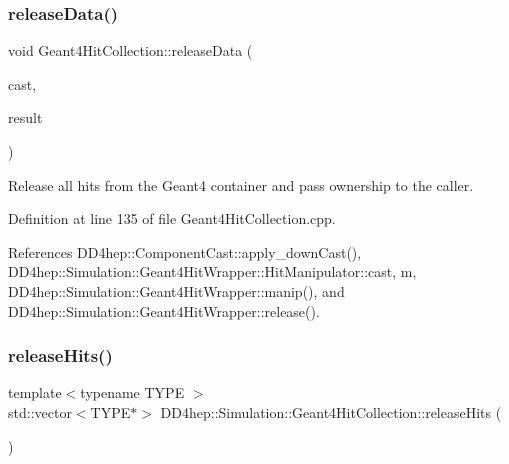 \subsubsection{\texorpdfstring{release\+Data()}{releaseData()}}
{\footnotesize\ttfamily void Geant4\+Hit\+Collection\+::release\+Data (\begin{DoxyParamCaption}\item[{const \hyperlink{class_d_d4hep_1_1_component_cast}{Component\+Cast} \&}]{cast,  }\item[{std\+::vector$<$ void $\ast$$>$ $\ast$}]{result }\end{DoxyParamCaption})\hspace{0.3cm}{\ttfamily [protected]}}



Release all hits from the Geant4 container and pass ownership to the caller. 



Definition at line 135 of file Geant4\+Hit\+Collection.\+cpp.



References D\+D4hep\+::\+Component\+Cast\+::apply\+\_\+down\+Cast(), D\+D4hep\+::\+Simulation\+::\+Geant4\+Hit\+Wrapper\+::\+Hit\+Manipulator\+::cast, m, D\+D4hep\+::\+Simulation\+::\+Geant4\+Hit\+Wrapper\+::manip(), and D\+D4hep\+::\+Simulation\+::\+Geant4\+Hit\+Wrapper\+::release().

\hypertarget{class_d_d4hep_1_1_simulation_1_1_geant4_hit_collection_a993344637917118c758aeea4b42892b8}{}\label{class_d_d4hep_1_1_simulation_1_1_geant4_hit_collection_a993344637917118c758aeea4b42892b8} 
\subsubsection{\texorpdfstring{release\+Hits()}{releaseHits()}}
{\footnotesize\ttfamily template$<$typename T\+Y\+PE $>$ \\
std\+::vector$<$T\+Y\+PE$\ast$$>$ D\+D4hep\+::\+Simulation\+::\+Geant4\+Hit\+Collection\+::release\+Hits (\begin{DoxyParamCaption}{ }\end{DoxyParamCaption})\hspace{0.3cm}{\ttfamily [inline]}}



